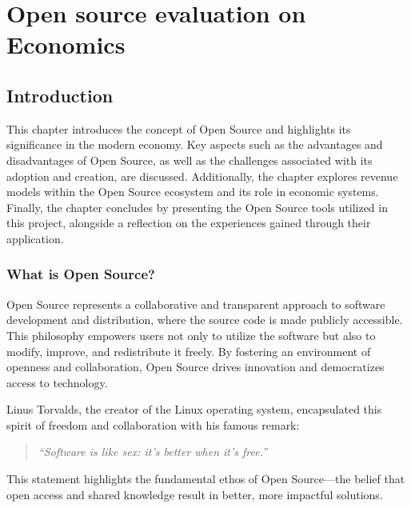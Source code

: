 \chapter{Open source evaluation on Economics}
\label{cha:Open_source_evaluation_Economics}

\section{Introduction}


This chapter introduces the concept of Open Source and highlights its significance in the modern economy. 
Key aspects such as the advantages and disadvantages of Open Source, as well as the challenges associated with its adoption and creation, are discussed. 
Additionally, the chapter explores revenue models within the Open Source ecosystem and its role in economic systems. 
Finally, the chapter concludes by presenting the Open Source tools utilized in this project, alongside a reflection on the experiences gained through their application.


\subsection{What is Open Source?}

Open Source represents a collaborative and transparent approach to software development and distribution, 
where the source code is made publicly accessible. This philosophy empowers users not only to utilize the software but also to modify, 
improve, and redistribute it freely. By fostering an environment of openness and collaboration, 
Open Source drives innovation and democratizes access to technology.

Linus Torvalds, the creator of the Linux operating system, encapsulated this spirit of freedom and collaboration with his famous remark:

\begin{quote}
    \textit{“Software is like sex: it's better when it's free.”}
    \author{Linus Torvalds}
\end{quote}

\cite{Linus_Torvalds_quote_open_source}

This statement highlights the fundamental ethos of Open Source—the belief that open access and shared knowledge result in better, more impactful solutions.


